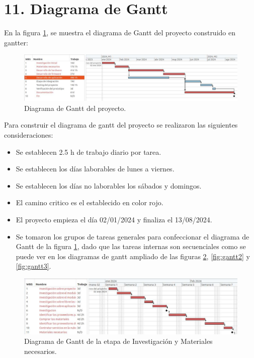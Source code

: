 \documentclass[
11pt, %
]{charter}
\begin{document}
\section{11. Diagrama de Gantt}
\label{sec:gantt}

En la figura \ref{fig:gantt}, se muestra el diagrama de Gantt del proyecto construido en gantter:


\begin{figure}[htpb]
\centering 
\includegraphics[width=1.0\textwidth, height=.43 \textwidth]{./Figuras/ganttProyecto.pdf}
\caption{Diagrama de Gantt del proyecto.}
\label{fig:gantt}
\end{figure}

Para construir el diagrama de gantt del proyecto se realizaron las siguientes consideraciones:

\begin{itemize}
\item Se establecen  2.5 h de trabajo diario por tarea.
\item Se establecen  los días laborables de lunes a viernes.
\item Se establecen  los días no laborables los sábados y domingos.
\item El camino critico es el establecido en color rojo.
\item El proyecto empieza el día 02/01/2024 y finaliza el 13/08/2024.
\item Se tomaron los grupos de tareas generales para confeccionar el diagrama de Gantt de la figura \ref{fig:gantt}, dado que las tareas internas son secuenciales como se puede ver en los diagramas de gantt ampliado de las figuras \ref{fig:gantt1}, \ref{fig:gantt2} y \ref{fig:gantt3}.
\end{itemize}



\begin{figure}[htpb]
\centering 
\includegraphics[width=1.0\textwidth, height=.43 \textwidth]{./Figuras/ganttProyecto1.pdf}
\caption{Diagrama de Gantt de la etapa de Investigación y Materiales necesarios.}
\label{fig:gantt1}
\end{figure}
\end{document}
